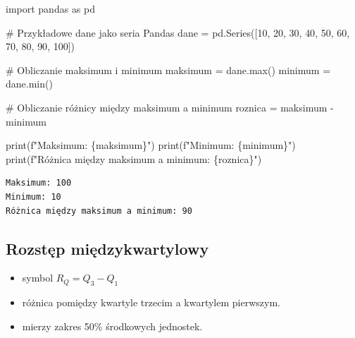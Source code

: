 \documentclass[
  polish,
  letterpaper,
  DIV=11,
  numbers=noendperiod]{scrreprt}
\newenvironment{Shaded}{\begin{snugshade}}{\end{snugshade}}
\newcommand{\BuiltInTok}[1]{\textcolor[rgb]{0.00,0.23,0.31}{#1}}
\newcommand{\CommentTok}[1]{\textcolor[rgb]{0.37,0.37,0.37}{#1}}
\newcommand{\DecValTok}[1]{\textcolor[rgb]{0.68,0.00,0.00}{#1}}
\newcommand{\ImportTok}[1]{\textcolor[rgb]{0.00,0.46,0.62}{#1}}
\newcommand{\NormalTok}[1]{\textcolor[rgb]{0.00,0.23,0.31}{#1}}
\newcommand{\OperatorTok}[1]{\textcolor[rgb]{0.37,0.37,0.37}{#1}}
\newcommand{\SpecialCharTok}[1]{\textcolor[rgb]{0.37,0.37,0.37}{#1}}
\newcommand{\SpecialStringTok}[1]{\textcolor[rgb]{0.13,0.47,0.30}{#1}}
\providecommand{\tightlist}{%
  \setlength{\itemsep}{0pt}\setlength{\parskip}{0pt}}
\begin{document}
\begin{Shaded}
\begin{Highlighting}[]
\ImportTok{import}\NormalTok{ pandas }\ImportTok{as}\NormalTok{ pd}

\CommentTok{\# Przykładowe dane jako seria Pandas}
\NormalTok{dane }\OperatorTok{=}\NormalTok{ pd.Series([}\DecValTok{10}\NormalTok{, }\DecValTok{20}\NormalTok{, }\DecValTok{30}\NormalTok{, }\DecValTok{40}\NormalTok{, }\DecValTok{50}\NormalTok{, }\DecValTok{60}\NormalTok{, }\DecValTok{70}\NormalTok{, }\DecValTok{80}\NormalTok{, }\DecValTok{90}\NormalTok{, }\DecValTok{100}\NormalTok{])}

\CommentTok{\# Obliczanie maksimum i minimum}
\NormalTok{maksimum }\OperatorTok{=}\NormalTok{ dane.}\BuiltInTok{max}\NormalTok{()}
\NormalTok{minimum }\OperatorTok{=}\NormalTok{ dane.}\BuiltInTok{min}\NormalTok{()}

\CommentTok{\# Obliczanie różnicy między maksimum a minimum}
\NormalTok{roznica }\OperatorTok{=}\NormalTok{ maksimum }\OperatorTok{{-}}\NormalTok{ minimum}

\BuiltInTok{print}\NormalTok{(}\SpecialStringTok{f"Maksimum: }\SpecialCharTok{\{}\NormalTok{maksimum}\SpecialCharTok{\}}\SpecialStringTok{"}\NormalTok{)}
\BuiltInTok{print}\NormalTok{(}\SpecialStringTok{f"Minimum: }\SpecialCharTok{\{}\NormalTok{minimum}\SpecialCharTok{\}}\SpecialStringTok{"}\NormalTok{)}
\BuiltInTok{print}\NormalTok{(}\SpecialStringTok{f"Różnica między maksimum a minimum: }\SpecialCharTok{\{}\NormalTok{roznica}\SpecialCharTok{\}}\SpecialStringTok{"}\NormalTok{)}
\end{Highlighting}
\end{Shaded}

\begin{verbatim}
Maksimum: 100
Minimum: 10
Różnica między maksimum a minimum: 90
\end{verbatim}

\subsection{Rozstęp
międzykwartylowy}\label{rozstux119p-miux119dzykwartylowy}

\begin{itemize}
\tightlist
\item
  symbol \(R_Q=Q_3-Q_1\)
\item
  różnica pomiędzy kwartyle trzecim a kwartylem pierwszym.
\item
  mierzy zakres 50\% środkowych jednostek.
\end{itemize}
\end{document}
